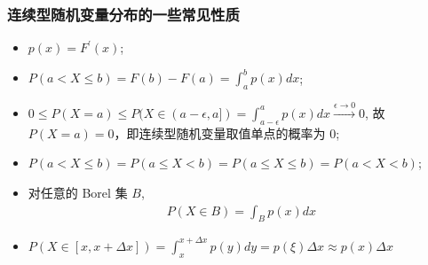 \documentclass[Prob-All.tex]{subfiles}
\begin{document}
\begin{frame}
	\frametitle{连续型随机变量分布的一些常见性质}
	\begin{itemize}
		\item $p(x)=F^\prime (x)$;
		\item $P(a< X\le b)=F(b)-F(a)=\int_a^bp(x)dx$;
		\item $0\le P (X=a)\le P (X\in (a-\epsilon,a])=\int_{a-\epsilon}^ap (x) dx\stackrel{\epsilon\rightarrow 0}{\longrightarrow} 0$, 故 $P (X=a)=0$，即连续型随机变量取值单点的概率为 0;
		\item $P(a<X\le b)=P(a\le X<b)=P(a\le X\le b)=P(a<X<b)$;
		\item 对任意的 Borel 集 $B$,
		      \begin{eqnarray*}
			      P(X\in B)=\int_Bp(x)dx
		      \end{eqnarray*}
		\item $P(X\in[x,x+\Delta x])=\int_x^{x+\Delta x}p(y)dy=p(\xi)\Delta x\approx p(x)\Delta x$
	\end{itemize}
\end{frame}
\end{document}
